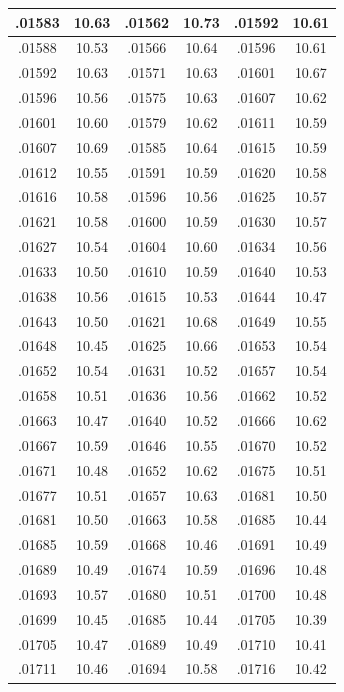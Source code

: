 \documentclass[10pt,twoside]{report}
\begin{document}
\begin{appendices}
\begin{longtable}{|c|c||c|c||c|c|}
.01583 & 10.63 & .01562 & 10.73 & .01592 & 10.61\\\hline
.01588 & 10.53 & .01566 & 10.64 & .01596 & 10.61\\\hline
.01592 & 10.63 & .01571 & 10.63 & .01601 & 10.67\\\hline
.01596 & 10.56 & .01575 & 10.63 & .01607 & 10.62\\\hline
.01601 & 10.60 & .01579 & 10.62 & .01611 & 10.59\\\hline
.01607 & 10.69 & .01585 & 10.64 & .01615 & 10.59\\\hline
.01612 & 10.55 & .01591 & 10.59 & .01620 & 10.58\\\hline
.01616 & 10.58 & .01596 & 10.56 & .01625 & 10.57\\\hline
.01621 & 10.58 & .01600 & 10.59 & .01630 & 10.57\\\hline
.01627 & 10.54 & .01604 & 10.60 & .01634 & 10.56\\\hline
.01633 & 10.50 & .01610 & 10.59 & .01640 & 10.53\\\hline
.01638 & 10.56 & .01615 & 10.53 & .01644 & 10.47\\\hline
.01643 & 10.50 & .01621 & 10.68 & .01649 & 10.55\\\hline
.01648 & 10.45 & .01625 & 10.66 & .01653 & 10.54\\\hline
.01652 & 10.54 & .01631 & 10.52 & .01657 & 10.54\\\hline
.01658 & 10.51 & .01636 & 10.56 & .01662 & 10.52\\\hline
.01663 & 10.47 & .01640 & 10.52 & .01666 & 10.62\\\hline
.01667 & 10.59 & .01646 & 10.55 & .01670 & 10.52\\\hline
.01671 & 10.48 & .01652 & 10.62 & .01675 & 10.51\\\hline
.01677 & 10.51 & .01657 & 10.63 & .01681 & 10.50\\\hline
.01681 & 10.50 & .01663 & 10.58 & .01685 & 10.44\\\hline
.01685 & 10.59 & .01668 & 10.46 & .01691 & 10.49\\\hline
.01689 & 10.49 & .01674 & 10.59 & .01696 & 10.48\\\hline
.01693 & 10.57 & .01680 & 10.51 & .01700 & 10.48\\\hline
.01699 & 10.45 & .01685 & 10.44 & .01705 & 10.39\\\hline
.01705 & 10.47 & .01689 & 10.49 & .01710 & 10.41\\\hline
.01711 & 10.46 & .01694 & 10.58 & .01716 & 10.42\\\hline

\end{longtable}
\end{appendices}
\end{document}
